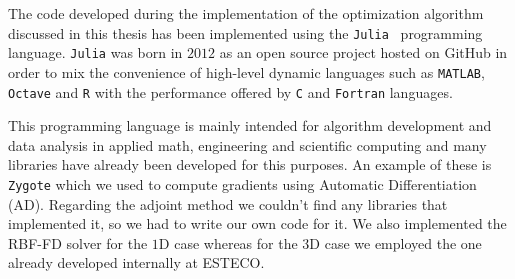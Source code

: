 \bigskip
The code developed during the implementation of the optimization algorithm discussed in this thesis has been implemented using the \verb*|Julia|~\cite{Bezanson:Julia_programming_language} programming language.
\verb*|Julia| was born in $2012$ as an open source project hosted on GitHub in order to mix the convenience of high-level dynamic languages such as \verb*|MATLAB|, \verb*|Octave| and \verb*|R| with the performance offered by \verb*|C| and \verb*|Fortran| languages.

This programming language is mainly intended for algorithm development and data analysis in applied math, engineering and scientific computing and many libraries have already been developed for this purposes. An example of these is \verb*|Zygote| which we used to compute gradients using Automatic Differentiation (AD). Regarding the adjoint method we couldn't find any libraries that implemented it, so we had to write our own code for it. We also implemented the RBF-FD solver for the $1$D case whereas for the $3$D case we employed the one already developed internally at ESTECO.
